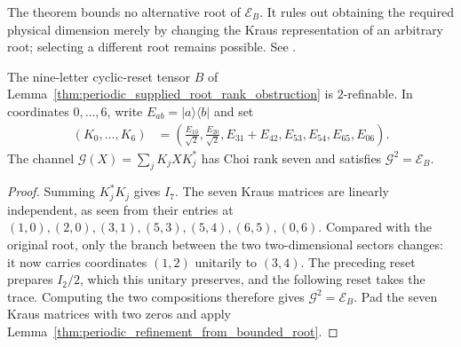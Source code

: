 \begin{remark}
    The theorem bounds no alternative root of $\mathcal E_B$.
    It rules out obtaining the required physical dimension merely by
    changing the Kraus representation of an arbitrary root;
    selecting a different root remains possible. See
    \cite{gap:dccsp17_root_kraus_rank_thm41}.
\end{remark}

\begin{lemma}
    \label{lem:periodic_cyclic_reset_alternative_root}
    \leanok
    The nine-letter cyclic-reset tensor $B$ of
    Lemma~\ref{thm:periodic_supplied_root_rank_obstruction} is $2$-refinable.
    In coordinates $0,\ldots,6$, write $E_{ab}=|a\rangle\langle b|$ and set
    \begin{align}
        (K_0,\ldots,K_6) & =
        \left(\frac{E_{10}}{\sqrt2},\frac{E_{20}}{\sqrt2},
        E_{31}+E_{42},E_{53},E_{54},E_{65},E_{06}\right).
        \label{eq:periodic_cyclic_reset_alternative_kraus}
    \end{align}
    The channel $\mathcal G(X)=\sum_jK_jXK_j^*$ has Choi rank seven
    and satisfies $\mathcal G^2=\mathcal E_B$.
\end{lemma}

\begin{proof}\leanok
    Summing $K_j^*K_j$ gives $I_7$. The seven Kraus matrices are
    linearly independent, as seen from their entries at
    $(1,0),(2,0),(3,1),(5,3),(5,4),(6,5),(0,6)$.
    Compared with the original root, only the branch between the two
    two-dimensional sectors changes: it now carries coordinates $(1,2)$
    unitarily to $(3,4)$. The preceding reset prepares $I_2/2$, which
    this unitary preserves, and the following reset takes the trace.
    Computing the two compositions therefore gives
    $\mathcal G^2=\mathcal E_B$. Pad the seven Kraus matrices with two
    zeros and apply Lemma~\ref{thm:periodic_refinement_from_bounded_root}.
\end{proof}

